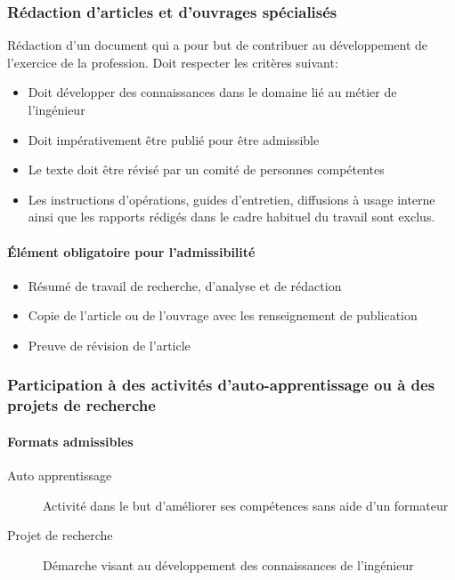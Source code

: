 		\subsubsection{Rédaction d'articles et d'ouvrages spécialisés}
		Rédaction d’un document qui a pour but de contribuer au développement de l’exercice de la profession. Doit respecter les critères suivant:
		\begin{itemize}
			\item Doit développer des connaissances dans le domaine lié au métier de l’ingénieur
			\item Doit impérativement être publié pour être admissible
			\item Le texte doit être révisé par un comité de personnes compétentes
			\item Les instructions d’opérations, guides d’entretien, diffusions à usage interne ainsi que les rapports rédigés dans le cadre habituel du travail sont exclus.
		\end{itemize}
		
		\paragraph{Élément obligatoire pour l’admissibilité}
		\begin{itemize}
			\item Résumé de travail de recherche, d’analyse et de rédaction
			\item Copie de l’article ou de l’ouvrage avec les renseignement de publication
			\item Preuve de révision de l’article
		\end{itemize}
		
		\subsubsection{Participation à des activités d'auto-apprentissage ou à des projets de recherche}

		\paragraph{Formats admissibles}
		\begin{description}
			\item[Auto apprentissage] Activité dans le but d’améliorer ses compétences sans aide d’un formateur
			\item[Projet de recherche] Démarche visant au développement des connaissances de l’ingénieur
		\end{description}

